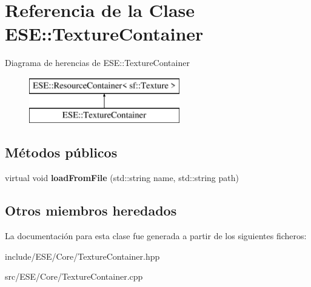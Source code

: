 \hypertarget{class_e_s_e_1_1_texture_container}{\section{Referencia de la Clase E\-S\-E\-:\-:Texture\-Container}
\label{class_e_s_e_1_1_texture_container}
}
Diagrama de herencias de E\-S\-E\-:\-:Texture\-Container\begin{figure}[H]
\begin{center}
\leavevmode
\includegraphics[height=2.000000cm]{class_e_s_e_1_1_texture_container}
\end{center}
\end{figure}
\subsection*{Métodos públicos}
\begin{DoxyCompactItemize}
\item 
\hypertarget{class_e_s_e_1_1_texture_container_a942ccb0fc6d4f59b58552e61cf366b55}{virtual void {\bfseries load\-From\-File} (std\-::string name, std\-::string path)}\label{class_e_s_e_1_1_texture_container_a942ccb0fc6d4f59b58552e61cf366b55}

\end{DoxyCompactItemize}
\subsection*{Otros miembros heredados}


La documentación para esta clase fue generada a partir de los siguientes ficheros\-:\begin{DoxyCompactItemize}
\item 
include/\-E\-S\-E/\-Core/Texture\-Container.\-hpp\item 
src/\-E\-S\-E/\-Core/Texture\-Container.\-cpp\end{DoxyCompactItemize}
